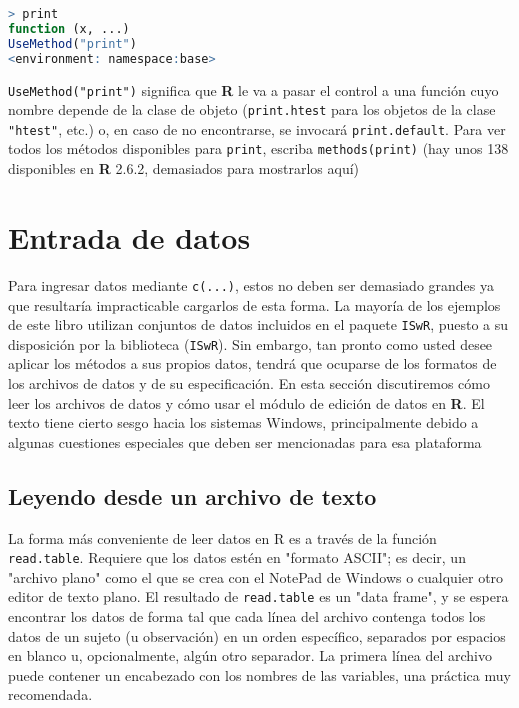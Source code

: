 \begin{lstlisting}[language=R]
> print
function (x, ...)
UseMethod("print")
<environment: namespace:base>
\end{lstlisting}

\texttt{UseMethod("print")} significa que \textbf{R} le va a pasar el control a
una función cuyo nombre depende de la clase de objeto (\texttt{print.htest} para
los objetos de la clase \texttt{"htest"}, etc.) o, en caso de no encontrarse, se
invocará \texttt{print.default}. Para ver todos los métodos disponibles para
\texttt{print}, escriba \texttt{methods(print)} (hay unos 138 disponibles en
\textbf{R} 2.6.2, demasiados para mostrarlos aquí)

\section{Entrada de datos}

Para ingresar datos mediante \texttt{c(...)}, estos no deben ser demasiado
grandes ya que resultaría impracticable cargarlos de esta forma. La mayoría de
los ejemplos de este libro utilizan conjuntos de datos incluidos en el paquete
\texttt{ISwR}, puesto a su disposición por la biblioteca (\texttt{ISwR}). Sin
embargo, tan pronto como usted desee aplicar los métodos a sus propios datos,
tendrá que ocuparse de los formatos de los archivos de datos y de su
especificación. En esta sección discutiremos cómo leer los archivos de datos y
cómo usar el módulo de edición de datos en \textbf{R}. El texto tiene cierto
sesgo hacia los sistemas Windows, principalmente debido a algunas cuestiones
especiales que deben ser mencionadas para esa plataforma


\subsection{Leyendo desde un archivo de texto} \label{readtextfile}
La forma más conveniente de leer datos en R es a través de la función
\texttt{read.table}. Requiere que los datos estén en "formato ASCII"; es decir,
un "archivo plano" como el que se crea con el NotePad de Windows o cualquier
otro editor de texto plano. El resultado de \texttt{read.table} es un "data
frame", y se espera encontrar los datos de forma tal que cada línea del archivo
contenga todos los datos de un sujeto (u observación) en un orden específico,
separados por espacios en blanco u, opcionalmente, algún otro separador. La
primera línea del archivo puede contener un encabezado con los nombres de las
variables, una práctica muy recomendada.

